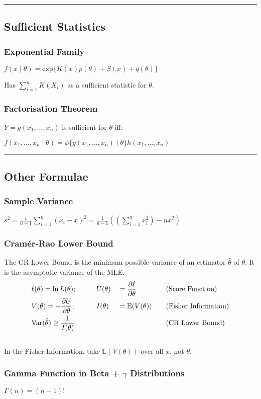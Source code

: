 \documentclass{article}
\begin{document}
\begin{multicols*}{2}
\noindent\rule{\linewidth}{0.25pt}
\subsection*{Sufficient Statistics}
\subsubsection*{Exponential Family}
\centerline{$f(x \mid \theta) = \mbox{exp}\{K(x)p(\theta) + S(x) + q(\theta)\}$}
Has $\sum_{i=1}^{n} K(X_{i})$ as a sufficient statistic for $\theta$.
\subsubsection*{Factorisation Theorem}
$Y = g(x_{1}, \dots, x_{n})$ is sufficient for $\theta$ iff:\\
\centerline{$f(x_{1}, \dots, x_{n} \mid \theta) = \phi\{g(x_{1}, \dots, x_{n}) \mid \theta\} h(x_{1}, \dots, x_{n})$}

\noindent\rule{\linewidth}{0.25pt}
\subsection*{Other Formulae}
\subsubsection*{Sample Variance}
$s^2 = \frac{1}{n-1} \sum_{i=1}^{n} (x_{i}-\bar{x})^2 = \frac{1}{n-1} \left( \left( \sum_{i=1}^{n} x_{i}^2 \right) -n \bar{x}^2 \right)$
\subsubsection*{Cramér-Rao Lower Bound}
The CR Lower Bound is the minimum possible variance of an estimator $\hat{\theta}$ of $\theta$. It is the asymptotic variance of the MLE.
\vspace{-0.2cm}
{\setlength{\mathindent}{0.5cm}
\begin{alignat*}{4}
    &\ell(\theta) = \ln L(\theta); &&\qquad U(\theta) &&= \frac{\partial \ell}{\partial \theta} &&\mbox{\quad (Score Function)}\\
    &V(\theta) = -\frac{\partial U}{\partial \theta}; &&\qquad I(\theta) &&= \mathbb{E}(V(\theta)) &&\mbox{\quad (Fisher Information)}\\
    &\mbox{Var}(\hat{\theta}) \geq \frac{1}{I(\theta)} && && &&\mbox{\quad (CR Lower Bound)}
\end{alignat*} \vspace{-0.5cm}}\\
\noindent In the Fisher Information, take $\mathbb{E}(V(\theta))$ over all $x$, not $\theta$.
\subsubsection*{Gamma Function in Beta + $\gamma$ Distributions}
$\Gamma(n) = (n-1)!$
\end{multicols*}
\end{document}
